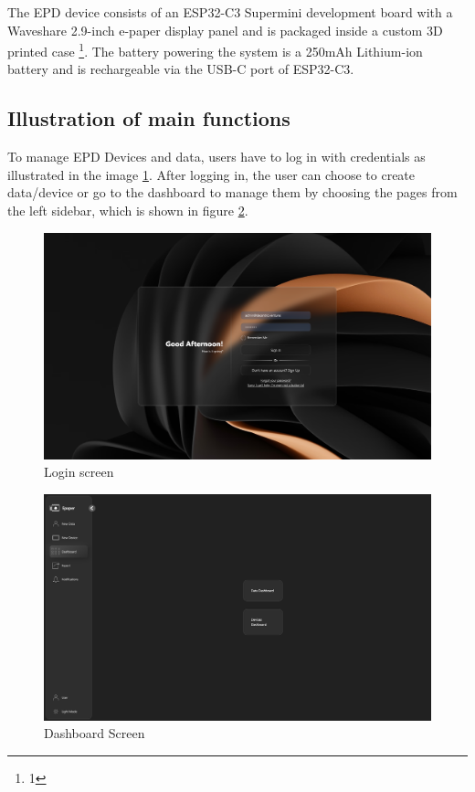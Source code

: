 \documentclass[../Main.tex]{subfiles}
\begin{document}
The \gls{EPD} device consists of an ESP32-C3 Supermini development board with a Waveshare 2.9-inch e-paper display panel and is packaged inside a custom 3D printed case \footnote{1}. The battery powering the system is a 250mAh Lithium-ion battery and is rechargeable via the USB-C port of ESP32-C3.

\subsection{Illustration of main functions}
To manage \gls{EPD} Devices and data, users have to log in with credentials as illustrated in the image \ref{fig:login-screen}. After logging in, the user can choose to create data/device or go to the dashboard to manage them by choosing the pages from the left sidebar, which is shown in figure \ref{fig:dashboard}. 
\begin{figure}[H]
    \centering
    \includegraphics[width=0.8\linewidth]{doc//imgs/ui_login.png}
    \caption{Login screen}
    \label{fig:login-screen}
\end{figure}

\begin{figure}[H]
    \centering
    \includegraphics[width=0.8\linewidth]{doc//imgs/ui_dashboard.png}

    \caption{Dashboard Screen}
    \label{fig:dashboard}
\end{figure}
\end{document}
